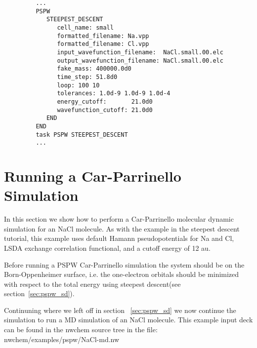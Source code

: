 \begin{enumerate}
\tiny \begin{verbatim}
         ...
         PSPW
            STEEPEST_DESCENT
               cell_name: small
               formatted_filename: Na.vpp
               formatted_filename: Cl.vpp
               input_wavefunction_filename:  NaCl.small.00.elc
               output_wavefunction_filename: NaCl.small.00.elc
               fake_mass: 400000.0d0
               time_step: 51.8d0
               loop: 100 10
               tolerances: 1.0d-9 1.0d-9 1.0d-4
               energy_cutoff:       21.0d0
               wavefunction_cutoff: 21.0d0
            END 
         END
         task PSPW STEEPEST_DESCENT
         ...
      \end{verbatim}


\end{enumerate}
\normalsize


\normalsize
\section{Running a Car-Parrinello Simulation}
\label{sec:pspw_cp}

In this section we show how to perform a Car-Parrinello
molecular dynamic simulation for an NaCl molecule.  As with the example in 
the steepest descent tutorial,  this example uses default Hamann 
pseudopotentials for Na and Cl, LSDA exchange 
correlation functional, and a cutoff energy of 12 au.

Before running a PSPW Car-Parrinello  simulation the system should be
on the Born-Oppenheimer surface, i.e. the one-electron
orbitals should be minimized with respect to the total energy using steepest
descent(see section~\ref{sec:pspw_sd}).  

Continuning where we left off in section ~\ref{sec:pspw_sd} we now 
continue the simulation to run a MD simulation of an NaCl molecule.  
This example input deck can be found in the nwchem source tree in 
the file: nwchem/examples/pspw/NaCl-md.nw

